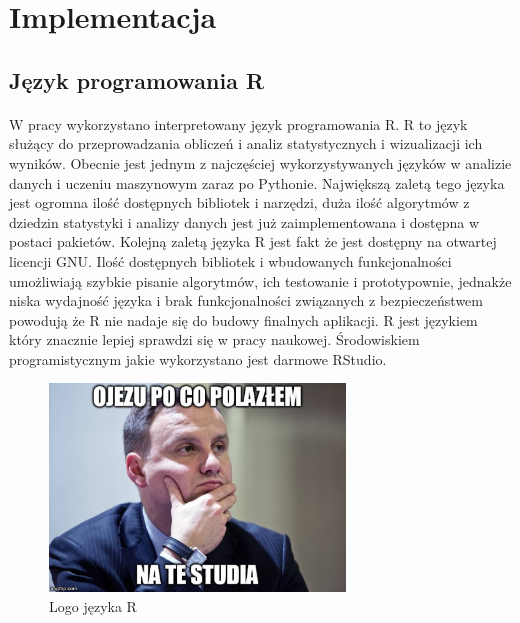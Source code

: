\documentclass[a4paper,12pt,twoside]{article}
\begin{document}
\paragraph{}


\newpage
\section{Implementacja}

\subsection{Język programowania R}
\paragraph{}
W pracy  wykorzystano interpretowany język programowania R. R to język służący do przeprowadzania obliczeń i analiz statystycznych i wizualizacji ich wyników. Obecnie jest jednym z najczęściej wykorzystywanych języków w analizie danych i uczeniu maszynowym zaraz po Pythonie. Największą zaletą tego języka jest ogromna ilość dostępnych bibliotek i narzędzi, duża ilość algorytmów z dziedzin statystyki i analizy danych jest już zaimplementowana i dostępna w postaci pakietów. Kolejną zaletą języka R jest fakt że jest dostępny na otwartej licencji GNU. Ilość dostępnych bibliotek i wbudowanych funkcjonalności umożliwiają szybkie pisanie algorytmów, ich testowanie i prototypownie, jednakże niska wydajność języka i brak funkcjonalności związanych z bezpieczeństwem powodują że R nie nadaje się do budowy finalnych aplikacji. R jest językiem który znacznie lepiej sprawdzi się w pracy naukowej. Środowiskiem programistycznym jakie wykorzystano jest darmowe RStudio.
\begin{figure}[h]
    \centering
    \includegraphics[width=0.7\textwidth]{dudel.jpg}
    \caption{Logo języka R}
\end{figure}
 \newpage
\end{document}

